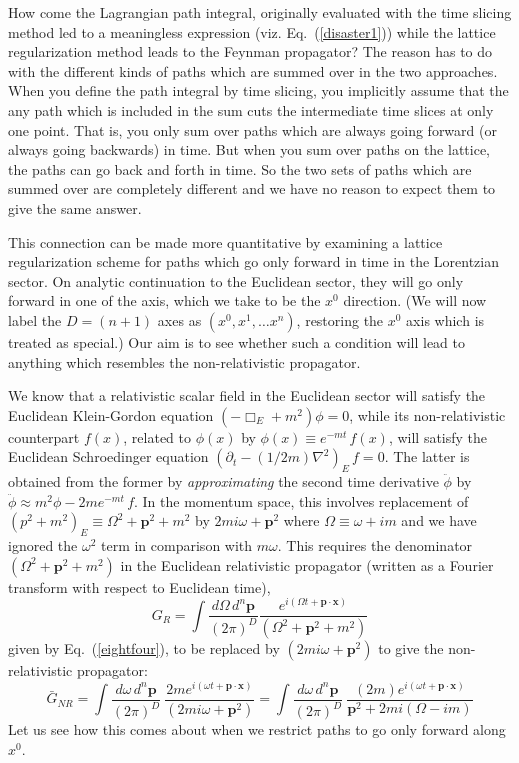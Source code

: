 \documentclass[12pt]{article}
\def\eq#1{{Eq.~(\ref{#1})}}
\begin{document}
How come the Lagrangian path integral, originally evaluated with the time slicing method led to a meaningless expression (viz. \eq{disaster1}) while the lattice regularization method leads to the Feynman propagator? The reason has to do with the different kinds of paths which are summed over in the two approaches. When you define the path integral by time slicing, you implicitly assume that the any path which is included in the sum cuts the intermediate time slices at only one point. That is, you only sum over paths which are always going forward (or always going backwards) in time. But when you sum over paths on the lattice, the paths can go back and forth in time. So the two sets of paths which are summed over are completely different and we have no reason to expect them to give the same answer.


This connection can be made more quantitative by examining a lattice regularization scheme for paths which go only forward in time in the Lorentzian sector. On analytic continuation to the Euclidean sector, they will go only forward in one of the axis, which we take to be the $x^0$ direction. 
(We will now label the $D=(n+1)$ axes as $(x^0, x^1, \ldots x^n)$, restoring the $x^0$ axis which is treated as special.)
Our aim is to see whether such a condition will lead to anything which resembles the non-relativistic propagator.

We know that a relativistic scalar field in the Euclidean sector will satisfy the Euclidean Klein-Gordon equation 
$
(-\Box_E + m^2)\phi =0
$, 
while its non-relativistic counterpart $f(x)$, related to $\phi(x)$ by 
$
\phi(x) \equiv e^{-mt}\, f(x)
$, 
will satisfy the Euclidean Schroedinger equation 
$
(\partial_t - (1/2m)\nabla^2)_E \, f=0
$.
 The latter is obtained from the former by \textit{approximating} the second time derivative $\ddot \phi$ by 
$
\ddot \phi \approx m^2 \phi - 2 me^{-mt} \, f
$.
In the momentum space, this involves replacement of
$
({p}^2 + m^2)_E \equiv \Omega^2 +\bm{p}^2 + m^2 
$ 
by
$
2mi\omega + \bm{p}^2
$ 
where
$
\Omega \equiv \omega + i m
$ 
and we have ignored the $\omega^2$ term in comparison with $m\omega$. This requires the  denominator $(\Omega^2 + \bm{p}^2+ m^2)$ in the Euclidean relativistic propagator (written as a Fourier transform with respect to Euclidean time), 
\begin{equation}
 G_R = \int \frac{d\Omega \, d^n \bm{p}}{(2\pi)^D} \frac{e^{i(\Omega t + \bm{p\cdot x})}}{(\Omega^2 + \bm{p}^2+ m^2)}
\end{equation} 
 given by \eq{eightfour}, to be replaced by $(2mi\omega + \bm{p}^2)$ to give the non-relativistic propagator:
\begin{equation}
 \bar{G}_{NR} = \int \frac{d\omega \,d^n \bm{p}}{(2\pi)^D}\ \frac{2me^{i(\omega t + \bm{p\cdot x})}}{(2mi\omega + \bm{p}^2)}
 =  \int \frac{d\omega \,d^n \bm{p}}{(2\pi)^D}\ \frac{(2m)e^{i(\omega t + \bm{p\cdot x})}}{ \bm{p}^2+2mi(\Omega -im)}
 \label{14oct9}
\end{equation} 
Let us see how this comes about when we restrict paths to go only forward along $x^0$.
\end{document}
